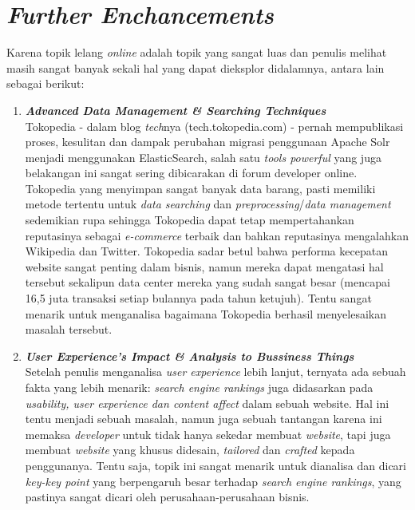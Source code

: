 	\section{\textit{Further Enchancements}}
	Karena topik lelang \textit{online} adalah topik yang sangat luas dan penulis melihat masih sangat banyak sekali hal yang dapat dieksplor didalamnya, antara lain sebagai berikut:
	\begin{enumerate}
		\item \textbf{\textit{Advanced Data Management \& Searching Techniques}} \\
			Tokopedia - dalam blog \textit{tech}nya (tech.tokopedia.com) - pernah mempublikasi proses, kesulitan dan dampak perubahan migrasi penggunaan Apache Solr menjadi menggunakan ElasticSearch, salah satu \textit{tools powerful} yang juga belakangan ini sangat sering dibicarakan di forum developer online. Tokopedia yang menyimpan sangat banyak data barang, pasti memiliki metode tertentu untuk \textit{data searching} dan \textit{preprocessing}/\textit{data management} sedemikian rupa sehingga Tokopedia dapat tetap mempertahankan reputasinya sebagai \textit{e-commerce} terbaik dan bahkan reputasinya mengalahkan Wikipedia dan Twitter. Tokopedia sadar betul bahwa performa kecepatan website sangat penting dalam bisnis, namun mereka dapat mengatasi hal tersebut sekalipun data center mereka yang sudah sangat besar (mencapai 16,5 juta transaksi setiap bulannya pada tahun ketujuh). Tentu sangat menarik untuk menganalisa bagaimana Tokopedia berhasil menyelesaikan masalah tersebut.
		\item \textbf{\textit{User Experience's Impact \& Analysis to Bussiness Things}} \\
			Setelah penulis menganalisa \textit{user experience} lebih lanjut, ternyata ada sebuah fakta yang lebih menarik: \textit{search engine rankings} juga didasarkan pada \textit{usability, user experience dan content affect} dalam sebuah website. Hal ini tentu menjadi sebuah masalah, namun juga sebuah tantangan karena ini memaksa \textit{developer} untuk tidak hanya sekedar membuat \textit{website}, tapi juga membuat \textit{website} yang khusus didesain, \textit{tailored} dan \textit{crafted} kepada penggunanya. Tentu saja, topik ini sangat menarik untuk dianalisa dan dicari \textit{key-key point} yang berpengaruh besar terhadap \textit{search engine rankings}, yang pastinya sangat dicari oleh perusahaan-perusahaan bisnis.
			

\end{enumerate}
